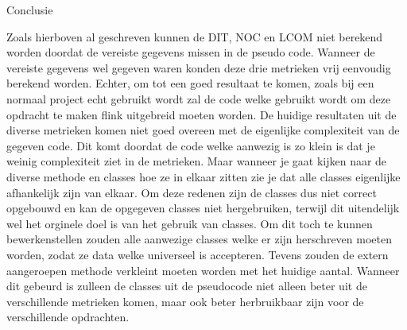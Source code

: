 \documentclass[a4paper,titlepage]{artikel1}
\begin{document}
   \begin{center}\begin{bf}Conclusie\end{bf}\end{center}
   Zoals hierboven al geschreven kunnen de DIT, NOC en LCOM niet berekend worden doordat de vereiste gegevens missen in de pseudo code. Wanneer de vereiste gegevens wel gegeven waren konden deze drie metrieken vrij eenvoudig berekend worden. Echter, om tot een goed resultaat te komen, zoals bij een normaal project echt gebruikt wordt zal de code welke gebruikt wordt om deze opdracht te maken flink uitgebreid moeten worden. De huidige resultaten uit de diverse metrieken komen niet goed overeen met de eigenlijke complexiteit van de gegeven code. Dit komt doordat de code welke aanwezig is zo klein is dat je weinig complexiteit ziet in de metrieken. Maar wanneer je gaat kijken naar de diverse methode en classes hoe ze in elkaar zitten zie je dat alle classes eigenlijke afhankelijk zijn van elkaar. Om deze redenen zijn de classes dus niet correct opgebouwd en kan de opgegeven classes niet hergebruiken, terwijl dit uitendelijk wel het orginele doel is van het gebruik van classes. Om dit toch te kunnen bewerkenstellen zouden alle aanwezige classes welke er zijn herschreven moeten worden, zodat ze data welke universeel is accepteren. Tevens zouden de extern aangeroepen methode verkleint moeten worden met het huidige aantal. Wanneer dit gebeurd is zulleen de classes uit de pseudocode niet alleen beter uit de verschillende metrieken komen, maar ook beter herbruikbaar zijn voor de verschillende opdrachten.
\end{document}
